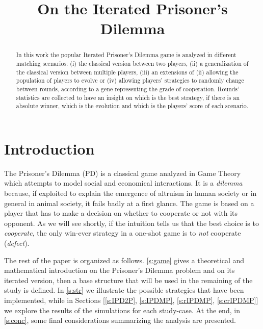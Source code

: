 \documentclass[journal,a4paper,10pt,twoside]{IEEEtran} %
\begin{document}
\title{On the Iterated Prisoner's Dilemma}

\author{%

}

\maketitle

\begin{abstract}
In this work the popular Iterated Prisoner's Dilemma game is analyzed in different matching scenarios: (i) the classical version between two players, (ii) a generalization of the classical version between multiple players, (iii) an extensions of (ii) allowing the population of players to evolve or (iv) allowing players' strategies to randomly change between rounds, according to a gene representing the grade of cooperation. %
Rounds' statistics are collected to have an insight on which is the best strategy, if there is an absolute winner, which is the evolution and which is the players' score of each scenario.
\end{abstract}

\section{Introduction} \label{s:intro}
The Prisoner's Dilemma (PD) is a classical game analyzed in Game Theory which attempts to model social and economical interactions. It is a \textit{dilemma} because, if exploited to explain the emergence of altruism in human society or in general in animal society, it fails badly at a first glance. The game is based on a player that has to make a decision on whether to cooperate or not with its opponent. As we will see shortly, if the intuition tells us that the best choice is to \textit{cooperate}, the only win-ever strategy in a one-shot game is to \textit{not} cooperate (\textit{defect}).

The rest of the paper is organized as follows.
\autoref{s:game} gives a theoretical and mathematical introduction on the Prisoner's Dilemma problem and on its iterated version, then a base structure that will be used in the remaining of the study is defined.
In \autoref{s:str} we illustrate the possible strategies that have been implemented, while in Sections [\ref{s:IPD2P}, \ref{s:IPDMP}, \ref{s:rIPDMP}, \ref{s:crIPDMP}] we explore the results of the simulations for each study-case.
At the end, in \autoref{s:conc}, some final considerations summarizing the analysis are presented.
\end{document}
